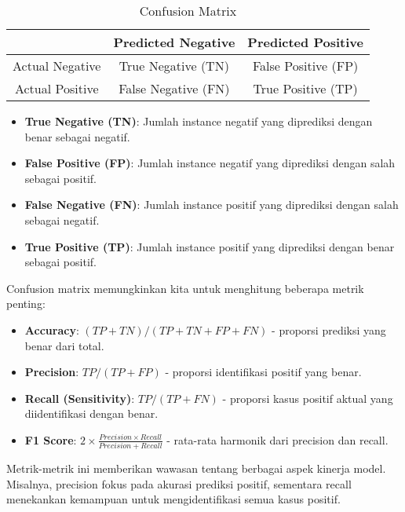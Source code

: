 \begin{table}[h]
    \centering
    \begin{tabular}{|c|c|c|}
        \hline
        & Predicted Negative & Predicted Positive \\
        \hline
        Actual Negative & True Negative (TN) & False Positive (FP) \\
        \hline
        Actual Positive & False Negative (FN) & True Positive (TP) \\
        \hline
    \end{tabular}
    \caption{Confusion Matrix}
    \label{tab:confusion_matrix}
\end{table}

\begin{itemize}
    \item \textbf{True Negative (TN)}: Jumlah instance negatif yang diprediksi dengan benar sebagai negatif.
    \item \textbf{False Positive (FP)}: Jumlah instance negatif yang diprediksi dengan salah sebagai positif.
    \item \textbf{False Negative (FN)}: Jumlah instance positif yang diprediksi dengan salah sebagai negatif.
    \item \textbf{True Positive (TP)}: Jumlah instance positif yang diprediksi dengan benar sebagai positif.
\end{itemize}

Confusion matrix memungkinkan kita untuk menghitung beberapa metrik penting:

\begin{itemize}
    \item \textbf{Accuracy}: $(TP + TN) / (TP + TN + FP + FN)$ - proporsi prediksi yang benar dari total.
    \item \textbf{Precision}: $TP / (TP + FP)$ - proporsi identifikasi positif yang benar.
    \item \textbf{Recall (Sensitivity)}: $TP / (TP + FN)$ - proporsi kasus positif aktual yang diidentifikasi dengan benar.
    \item \textbf{F1 Score}: $2 \times \frac{Precision \times Recall}{Precision + Recall}$ - rata-rata harmonik dari precision dan recall.
\end{itemize}

Metrik-metrik ini memberikan wawasan tentang berbagai aspek kinerja model. Misalnya, precision fokus pada akurasi prediksi positif, sementara recall menekankan kemampuan untuk mengidentifikasi semua kasus positif.

